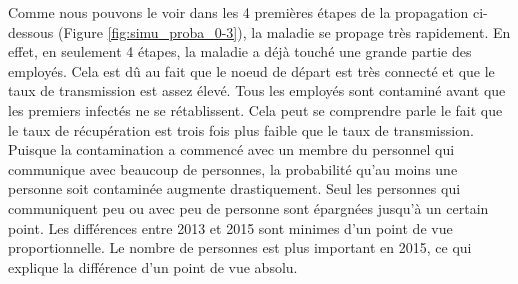 \documentclass{article}
\begin{document}
Comme nous pouvons le voir dans les 4 premières étapes de la propagation ci-dessous (Figure \ref{fig:simu_proba_0-3}), la maladie se propage très rapidement. En effet, en seulement 4 étapes, la maladie a déjà touché une grande partie des employés. Cela est dû au fait que le noeud de départ est très connecté et que le taux de transmission est assez élevé. Tous les employés sont contaminé avant que les premiers infectés ne se rétablissent. Cela peut se comprendre parle le fait que le taux de récupération est trois fois plus faible que le taux de transmission. Puisque la contamination a commencé avec un membre du personnel qui communique avec beaucoup de personnes, la probabilité qu'au moins une personne soit contaminée augmente drastiquement. Seul les personnes qui communiquent peu ou avec peu de personne sont épargnées jusqu'à un certain point. Les différences entre 2013 et 2015 sont minimes d'un point de vue proportionnelle. Le nombre de personnes est plus important en 2015, ce qui explique la différence d'un point de vue absolu.
\end{document}
